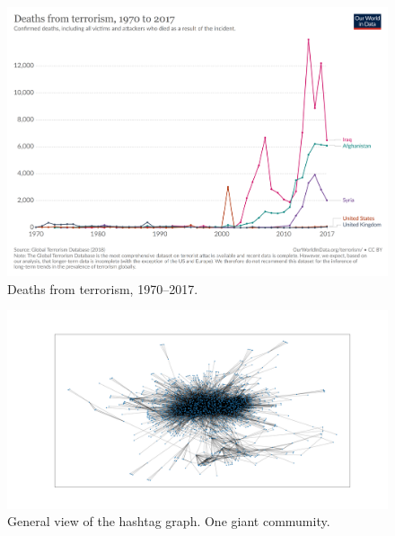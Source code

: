 \documentclass[conference]{IEEEtran}
\begin{document}
    \begin{figure}
        \includegraphics[scale=0.15]{figures/fatalities-from-terrorism}
        \caption{Deaths from terrorism, 1970--2017.}
        \label{fig:appendix_terrorism_deaths}
    \end{figure}\label{subsec:data-verification-after-some-pre-processing-methods}

    \begin{figure}
        \includegraphics[scale=0.32]{figures/general_graph}
        \caption{General view of the hashtag graph. One giant commumity.}
        \label{fig:graph-general}
    \end{figure}
\end{document}
